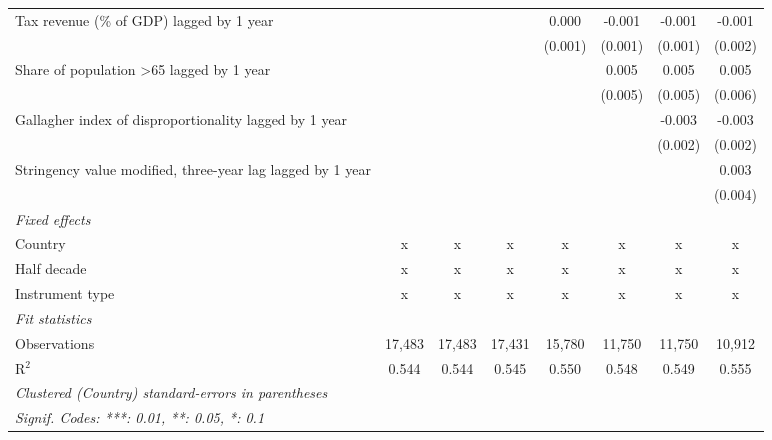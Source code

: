 \begin{tabular}{lccccccc}
   Tax revenue (\% of GDP) lagged by 1 year                                      &              &              &              & 0.000   & -0.001  & -0.001  & -0.001\\   
                                                                                 &              &              &              & (0.001) & (0.001) & (0.001) & (0.002)\\   
   Share of population >65 lagged by 1 year                                      &              &              &              &         & 0.005   & 0.005   & 0.005\\   
                                                                                 &              &              &              &         & (0.005) & (0.005) & (0.006)\\   
   Gallagher index of disproportionality lagged by 1 year                        &              &              &              &         &         & -0.003  & -0.003\\   
                                                                                 &              &              &              &         &         & (0.002) & (0.002)\\   
   Stringency value modified, three-year lag lagged by 1 year                    &              &              &              &         &         &         & 0.003\\   
                                                                                 &              &              &              &         &         &         & (0.004)\\   
   \emph{Fixed effects}\\
   Country                                                                       & x            & x            & x            & x       & x       & x       & x\\  
   Half decade                                                                   & x            & x            & x            & x       & x       & x       & x\\  
   Instrument type                                                               & x            & x            & x            & x       & x       & x       & x\\  
   \midrule \emph{Fit statistics}\\
   Observations                                                                  & 17,483       & 17,483       & 17,431       & 15,780  & 11,750  & 11,750  & 10,912\\  
   R$^2$                                                                         & 0.544        & 0.544        & 0.545        & 0.550   & 0.548   & 0.549   & 0.555\\  
   \midrule
   \multicolumn{8}{l}{\emph{Clustered (Country) standard-errors in parentheses}}\\
   \multicolumn{8}{l}{\emph{Signif. Codes: ***: 0.01, **: 0.05, *: 0.1}}\\
\end{tabular}
\par\endgroup


